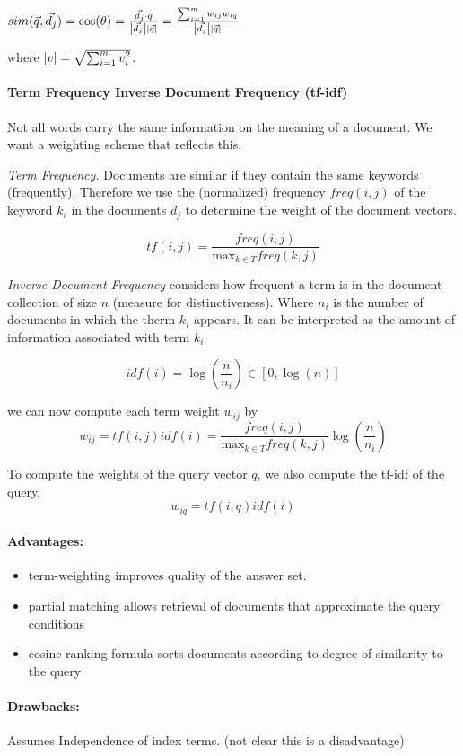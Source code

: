 $sim(\vec{q}, \vec{d_j}) = \cos(\theta)= \frac{\vec{d_j} \cdot \vec{q}}{\left| \vec{d_j} \right|\left| \vec{q} \right|}= \frac{\sum_{i=1}^m w_{ij}w_{iq}}{\left| \vec{d_j} \right|\left| \vec{q} \right|}$


where $\left| v \right| = \sqrt{\sum_{i=1}^m v_i^2}$.

\paragraph{Term Frequency Inverse Document Frequency (tf-idf)} Not all words carry the same information on the meaning of a document. We want a weighting scheme that reflects this.

\textit{Term Frequency.} Documents are similar if they contain the same keywords (frequently). Therefore we use the (normalized) frequency $freq(i,j)$ of the keyword $k_i$ in the documents $d_j$ to determine the weight of the document vectors.

\[tf(i,j) = \frac{freq(i,j)}{\text{max}_{k \in T}freq(k,j)}\]

\textit{Inverse Document Frequency} considers how frequent a term is in the document collection of size $n$ (measure for distinctiveness). Where $n_i$ is the number of documents in which the therm $k_i$ appears. It can be interpreted as the amount of information associated with term $k_i$

\[idf(i)= \log(\frac{n}{n_i}) \in [0,\log(n)]\]

we can now compute each term weight $w_{ij}$ by
\[w_{ij} = tf(i,j)idf(i) = \frac{freq(i,j)}{\text{max}_{k \in T}freq(k,j)} \log(\frac{n}{n_i})\]

To compute the weights of the query vector $q$, we also compute the tf-idf of the query. 
\[w_{iq} = tf(i,q)idf(i)\]

\paragraph{Advantages:}
\begin{itemize}
\item term-weighting improves quality of the answer set. 
\item partial matching allows retrieval of documents that approximate the query conditions
\item cosine ranking formula sorts documents according to degree of similarity to the query
\end{itemize} 
\paragraph{Drawbacks:} Assumes Independence of index terms. (not clear this is a disadvantage)
